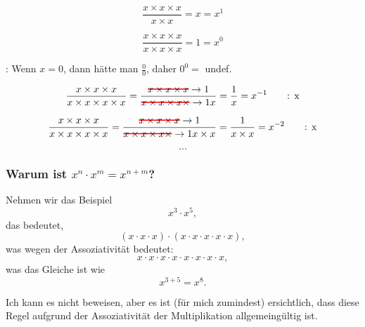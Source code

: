 \documentclass{scrartcl}
\newcommand\hcancel[2][black]{\setbox0=\hbox{$#2$}%
\rlap{\raisebox{.45\ht0}{\textcolor{#1}{\rule{\wd0}{1pt}}}}#2}
\begin{document}
\begin{equation}
\frac{x \times x \times x}{x \times x} = x = x^1 \tag*{: x}
\end{equation}

\begin{equation}
\frac{x \times x \times x}{x \times x \times x} = 1 = x^0 \tag*{: x}
\end{equation}

\begin{center}
	\danger: Wenn $x = 0$, dann hätte man $\frac{0}{0}$, daher $0^0 = $ undef.
\end{center}

\begin{equation}
\frac{x \times x \times x}{x \times x \times x \times x} = \frac{\hcancel[red]{x \times x \times x} \rightarrow 1}{\hcancel[red]{x \times x \times x \times} \rightarrow 1 x} = \frac{1}{x} = x^{-1} \tag*{: x}
\end{equation}

\begin{equation}
\frac{x \times x \times x}{x \times x \times x \times x} = \frac{\hcancel[red]{x \times x \times x} \rightarrow 1}{\hcancel[red]{x \times x \times x \times} \rightarrow 1 x \times x} = \frac{1}{x \times x} = x^{-2} \tag*{: x}
\end{equation}

$$
\dots
$$


\subsubsection{Warum ist $x^n \cdot x^m = x^{n + m}$?}

Nehmen wir das Beispiel
\begin{equation}
	x^3 \cdot x^5,
\end{equation}
das bedeutet,
\begin{equation}
	(x \cdot x \cdot x) \cdot (x\cdot x\cdot x\cdot x\cdot x),
\end{equation}
was wegen der Assoziativität bedeutet:
\begin{equation}
	x \cdot x \cdot x \cdot x\cdot x\cdot x\cdot x\cdot x,
\end{equation}
was das Gleiche ist wie
\begin{equation}
	x^{3 + 5} = x^8.
\end{equation}

Ich kann es nicht beweisen, aber es ist (für mich zumindest) ersichtlich, dass diese Regel aufgrund der Assoziativität
der Multiplikation allgemeingültig ist.
\end{document}
